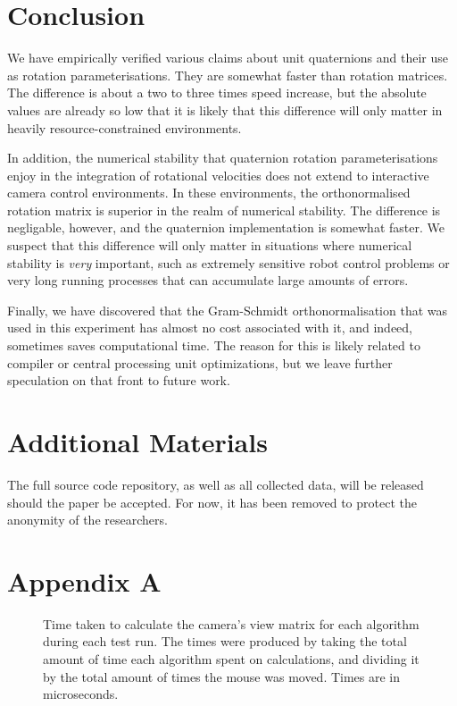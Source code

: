 \documentclass{acm_proc_article-sp}
\begin{document}
\section{Conclusion}

We have empirically verified various claims about unit quaternions and their use as rotation parameterisations.
They are somewhat faster than rotation matrices.
The difference is about a two to three times speed increase, but the absolute values are already so low that it is likely that this difference will only matter in heavily resource-constrained environments.

In addition, the numerical stability that quaternion rotation parameterisations enjoy in the integration of rotational velocities does not extend to interactive camera control environments.
In these environments, the orthonormalised rotation matrix is superior in the realm of numerical stability.
The difference is negligable, however, and the quaternion implementation is somewhat faster.
We suspect that this difference will only matter in situations where numerical stability is \emph{very} important, such as extremely sensitive robot control problems or very long running processes that can accumulate large amounts of errors.

Finally, we have discovered that the Gram-Schmidt orthonormalisation that was used in this experiment has almost no cost associated with it, and indeed, sometimes saves computational time.
The reason for this is likely related to compiler or central processing unit optimizations, but we leave further speculation on that front to future work.

\section{Additional Materials}

The full source code repository, as well as all collected data, will be released should the paper be accepted.
For now, it has been removed to protect the anonymity of the researchers.




\onecolumn
\newpage

\section*{Appendix A}

\begin{figure}[h]
\caption{Time taken to calculate the camera's view matrix for each algorithm during each test run.
The times were produced by taking the total amount of time each algorithm spent on calculations, and dividing it by the total amount of times the mouse was moved.
Times are in microseconds.}
\label{fig:performance-table}
\end{figure}
\end{document}
